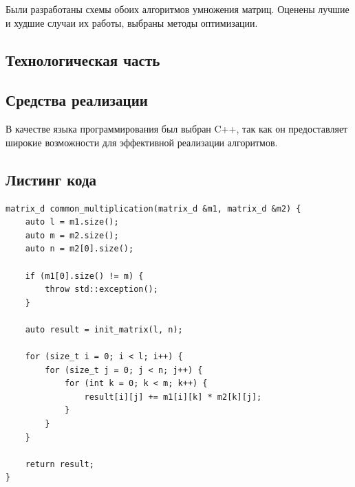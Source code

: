 \documentclass[a4paper,12pt]{article}
\begin{document}
    	\qquad Были разработаны схемы обоих алгоритмов умножения матриц. Оценены лучшие и худшие случаи их работы, выбраны методы оптимизации.
    	
    \newpage
    
    \begin{center}
     	\section{Технологическая часть}
        \subsection{Средства реализации}    
    \end{center}
    
		В качестве языка программирования был выбран C++, так как он предоставляет широкие возможности для эффективной реализации алгоритмов.
	\begin{center}
	\end{center}

    \begin{center}
        \subsection{Листинг кода}    
    \end{center}
        	
        		\begin{lstlisting}[frame=single,caption=Стандартный алгоритм умножения матриц, breaklines]
matrix_d common_multiplication(matrix_d &m1, matrix_d &m2) {
    auto l = m1.size();
    auto m = m2.size();
    auto n = m2[0].size();

    if (m1[0].size() != m) {
        throw std::exception();
    }

    auto result = init_matrix(l, n);

    for (size_t i = 0; i < l; i++) {
        for (size_t j = 0; j < n; j++) {
            for (int k = 0; k < m; k++) {
                result[i][j] += m1[i][k] * m2[k][j];
            }
        }
    }

    return result;
}
        		\end{lstlisting}        		
    
\end{document}
